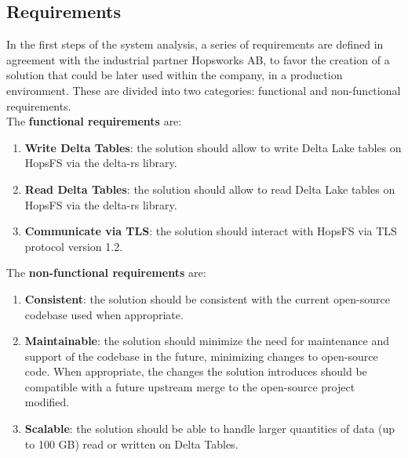 \subsection{Requirements}
In the first steps of the system analysis, a series of requirements are defined in agreement with the industrial partner Hopsworks AB, to favor the creation of a solution that could be later used within the company, in a production environment. These are divided into two categories: functional and non-functional requirements. \\ The \textbf{functional requirements} are:
\begin{enumerate}
    \item \textbf{Write Delta Tables}: the solution should allow to write Delta Lake tables on \gls{HopsFS} via the delta-rs library.
    \item \textbf{Read Delta Tables}: the solution should allow to read Delta Lake tables on \gls{HopsFS} via the delta-rs library.
    \item \textbf{Communicate via TLS}: the solution should interact with \gls{HopsFS} via \gls{TLS} protocol version 1.2.
\end{enumerate}
The \textbf{non-functional requirements} are:
\begin{enumerate}
    \item \textbf{Consistent}: the solution should be consistent with the current open-source codebase used when appropriate.
    \item \textbf{Maintainable}: the solution should minimize the need for maintenance and support of the codebase in the future, minimizing changes to open-source code. When appropriate, the changes the solution introduces should be compatible with a future upstream merge to the open-source project modified.
    \item \textbf{Scalable}: the solution should be able to handle larger quantities of data (up to 100 GB) read or written on Delta Tables.
\end{enumerate}

